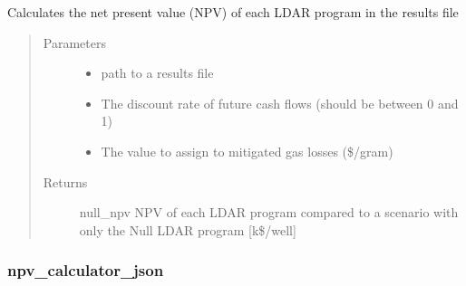 \documentclass[letterpaper,10pt,english]{sphinxmanual}
\begin{document}
\begin{fulllineitems}
\label{\detokenize{index:feast.ResultsProcessing.results_analysis_functions.npv_calculator}}
Calculates the net present value (NPV) of each LDAR program in the results file
\begin{quote}\begin{description}
\item[{Parameters}] \leavevmode\begin{itemize}
\item {} 
 \textendash{} path to a results file

\item {} 
 \textendash{} The discount rate of future cash flows (should be between 0 and 1)

\item {} 
 \textendash{} The value to assign to mitigated gas losses (\$/gram)

\end{itemize}

\item[{Returns}] \leavevmode
null\_npv          NPV of each LDAR program compared to a scenario with only the Null LDAR program {[}k\$/well{]}

\end{description}\end{quote}

\end{fulllineitems}



\subsubsection{npv\_calculator\_json}
\label{\detokenize{index:npv-calculator-json}}
\end{document}
